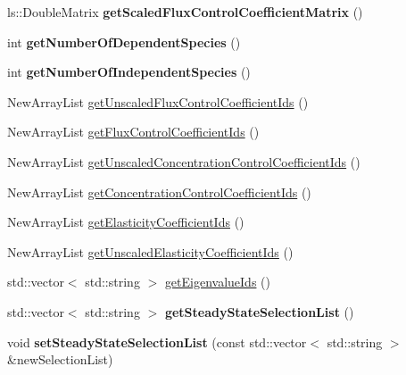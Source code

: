 \begin{DoxyCompactItemize}
\item 
\hypertarget{classrr_1_1_road_runner_abe4dde40c03d296f2ed45db095779c28}{ls\-::\-Double\-Matrix {\bfseries get\-Scaled\-Flux\-Control\-Coefficient\-Matrix} ()}\label{classrr_1_1_road_runner_abe4dde40c03d296f2ed45db095779c28}

\item 
\hypertarget{classrr_1_1_road_runner_a78708a8b3088ada0b5d7b2630a24904e}{int {\bfseries get\-Number\-Of\-Dependent\-Species} ()}\label{classrr_1_1_road_runner_a78708a8b3088ada0b5d7b2630a24904e}

\item 
\hypertarget{classrr_1_1_road_runner_a0cbcdf248d716058325e50adf9239d4d}{int {\bfseries get\-Number\-Of\-Independent\-Species} ()}\label{classrr_1_1_road_runner_a0cbcdf248d716058325e50adf9239d4d}

\item 
New\-Array\-List \hyperlink{classrr_1_1_road_runner_ad8c4fb1e371aa0aae7d526852d735cca}{get\-Unscaled\-Flux\-Control\-Coefficient\-Ids} ()
\item 
New\-Array\-List \hyperlink{classrr_1_1_road_runner_aa86c7d1f1e4ea63a6682057012798ba4}{get\-Flux\-Control\-Coefficient\-Ids} ()
\item 
New\-Array\-List \hyperlink{classrr_1_1_road_runner_a5f1ec08327987f8db240384b7dacb612}{get\-Unscaled\-Concentration\-Control\-Coefficient\-Ids} ()
\item 
New\-Array\-List \hyperlink{classrr_1_1_road_runner_aa5e73ec2cffc8af01adef44f95991754}{get\-Concentration\-Control\-Coefficient\-Ids} ()
\item 
New\-Array\-List \hyperlink{classrr_1_1_road_runner_ae718da692d33600644a9017d1d2b9947}{get\-Elasticity\-Coefficient\-Ids} ()
\item 
New\-Array\-List \hyperlink{classrr_1_1_road_runner_adad3fdd2e30911720d1c5719748f8f13}{get\-Unscaled\-Elasticity\-Coefficient\-Ids} ()
\item 
std\-::vector$<$ std\-::string $>$ \hyperlink{classrr_1_1_road_runner_afef1779a575df9d4905d281e485795f1}{get\-Eigenvalue\-Ids} ()
\item 
\hypertarget{classrr_1_1_road_runner_a683644a637a9cad0cb127c8e70734494}{std\-::vector$<$ std\-::string $>$ {\bfseries get\-Steady\-State\-Selection\-List} ()}\label{classrr_1_1_road_runner_a683644a637a9cad0cb127c8e70734494}

\item 
\hypertarget{classrr_1_1_road_runner_a633566f910a2137f8085df12a16d3d9a}{void {\bfseries set\-Steady\-State\-Selection\-List} (const std\-::vector$<$ std\-::string $>$ \&new\-Selection\-List)}\label{classrr_1_1_road_runner_a633566f910a2137f8085df12a16d3d9a}


\end{DoxyCompactItemize}
